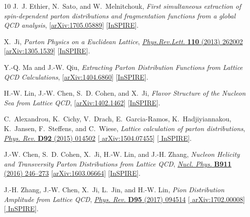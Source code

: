 \begin{thebibliography}{10}
J.~J. Ethier, N.~Sato, and W.~Melnitchouk,
{\it {First simultaneous extraction of spin-dependent parton distributions and
  fragmentation functions from a global QCD analysis}},
  [\href{http://arxiv.org/abs/1705.05889}{{\ttfamily arXiv:1705.05889}}]
  [\href{http://inspirehep.net/record/1599958}{{\ttfamily InSPIRE}}].

X.~Ji, {\it {Parton Physics on a Euclidean Lattice}},
\href{http://dx.doi.org/10.1103/PhysRevLett.110.262002}{{\em Phys.Rev.Lett.}
  {\bfseries 110} (2013) 262002}
  [\href{http://arxiv.org/abs/1305.1539}{{\ttfamily arXiv:1305.1539}}]
  [\href{http://inspirehep.net/record/1232221}{{\ttfamily InSPIRE}}].

Y.-Q. Ma and J.-W. Qiu,
{\it {Extracting Parton Distribution Functions from Lattice QCD Calculations}},
   [\href{http://arxiv.org/abs/1404.6860}{{\ttfamily arXiv:1404.6860}}]
  [\href{http://inspirehep.net/record/1292807}{{\ttfamily InSPIRE}}].

H.-W. Lin, J.-W. Chen, S.~D. Cohen, and X.~Ji,
{\it {Flavor Structure of the Nucleon Sea from Lattice QCD}},
  [\href{http://arxiv.org/abs/1402.1462}{{\ttfamily arXiv:1402.1462}}]
  [\href{http://inspirehep.net/record/1280317}{{\ttfamily InSPIRE}}].

C.~Alexandrou, K.~Cichy, V.~Drach, E.~Garcia-Ramos, K.~Hadjiyiannakou,
  K.~Jansen, F.~Steffens, and C.~Wiese, {\it {Lattice calculation of parton
  distributions}},
\href{http://dx.doi.org/10.1103/PhysRevD.92.014502}{{\em Phys. Rev.} {\bfseries
  D92} (2015) 014502} [\href{http://arxiv.org/abs/1504.07455}{{\ttfamily
  arXiv:1504.07455}}] [\href{http://inspirehep.net/record/1365095}{{\ttfamily
  InSPIRE}}].

J.-W. Chen, S.~D. Cohen, X.~Ji, H.-W. Lin, and J.-H. Zhang, {\it {Nucleon
  Helicity and Transversity Parton Distributions from Lattice QCD}},
\href{http://dx.doi.org/10.1016/j.nuclphysb.2016.07.033}{{\em Nucl. Phys.}
  {\bfseries B911} (2016) 246--273}
  [\href{http://arxiv.org/abs/1603.06664}{{\ttfamily arXiv:1603.06664}}]
  [\href{http://inspirehep.net/record/1431989}{{\ttfamily InSPIRE}}].

J.-H. Zhang, J.-W. Chen, X.~Ji, L.~Jin, and H.-W. Lin, {\it {Pion Distribution
  Amplitude from Lattice QCD}},
\href{http://dx.doi.org/10.1103/PhysRevD.95.094514}{{\em Phys. Rev.} {\bfseries
  D95} (2017) 094514} [\href{http://arxiv.org/abs/1702.00008}{{\ttfamily
  arXiv:1702.00008}}] [\href{http://inspirehep.net/record/1511678}{{\ttfamily
  InSPIRE}}].


\end{thebibliography}
